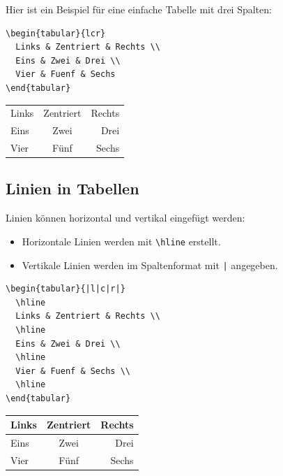 \documentclass[12pt,a4paper]{article}
\begin{document}
Hier ist ein Beispiel für eine einfache Tabelle mit drei Spalten:

\begin{lstlisting}[style=latex]
\begin{tabular}{lcr}
  Links & Zentriert & Rechts \\
  Eins & Zwei & Drei \\
  Vier & Fuenf & Sechs
\end{tabular}
\end{lstlisting}

\begin{ausgabe}
\begin{center}
\begin{tabular}{lcr}
  Links & Zentriert & Rechts \\
  Eins & Zwei & Drei \\
  Vier & Fünf & Sechs
\end{tabular}
\end{center}
\end{ausgabe}

\subsection{Linien in Tabellen}

Linien können horizontal und vertikal eingefügt werden:

\begin{itemize}
    \item Horizontale Linien werden mit \texttt{\textbackslash hline} erstellt.
    \item Vertikale Linien werden im Spaltenformat mit \texttt{|} angegeben.
\end{itemize}

\begin{lstlisting}[style=latex]
\begin{tabular}{|l|c|r|}
  \hline
  Links & Zentriert & Rechts \\
  \hline
  Eins & Zwei & Drei \\
  \hline
  Vier & Fuenf & Sechs \\
  \hline
\end{tabular}
\end{lstlisting}

\begin{ausgabe}
\begin{center}
\begin{tabular}{|l|c|r|}
  \hline
  Links & Zentriert & Rechts \\
  \hline
  Eins & Zwei & Drei \\
  \hline
  Vier & Fünf & Sechs \\
  \hline
\end{tabular}
\end{center}
\end{ausgabe}
\end{document}
